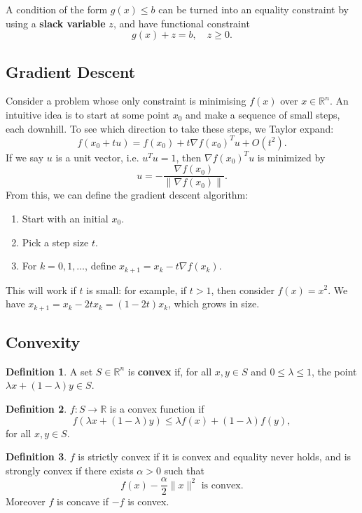 \documentclass[12pt]{article}
\theoremstyle{definition}
\newtheorem{definition}{Definition}[section]
\theoremstyle{remark}
\begin{document}
A condition of the form $g(x) \leq b$ can be turned into an equality constraint by using a \textbf{slack variable} $z$, and have functional constraint
\[
	g(x) + z = b, \quad z \geq 0
.\]

\subsection{Gradient Descent}%
\label{sub:gradient_descent}

Consider a problem whose only constraint is minimising $f(x)$ over $x \in \mathbb{R}^{n}$. An intuitive idea is to start at some point $x_0$ and make a sequence of small steps, each downhill. To see which direction to take these steps, we Taylor expand:
\[
	f(x_0 + tu) = f(x_0) + t \nabla f(x_0)^{T} u + O(t^2)
.\]
If we say $u$ is a unit vector, i.e. $u^{T}u = 1$, then $\nabla f(x_0)^{T}u$ is minimized by
\[
	u = - \frac{\nabla f(x_0)}{\|\nabla f(x_0)\|}
.\]
From this, we can define the gradient descent algorithm:
\begin{enumerate}[1)]
	\item Start with an initial $x_0$.
	\item Pick a step size $t$.
	\item For $k = 0, 1, \ldots$, define $x_{k+1} = x_k - t \nabla f(x_k)$.
\end{enumerate}
This will work if $t$ is small: for example, if $t > 1$, then consider $f(x) = x^2$. We have $x_{k+1} = x_k - 2tx_k = (1 - 2t)x_k$, which grows in size.

\subsection{Convexity}%
\label{sub:convexity}

\begin{definition}
	A set $S \in \mathbb{R}^{n}$ is \textbf{convex} if, for all $x, y \in S$ and $0 \leq \lambda \leq 1$, the point $\lambda x + (1 - \lambda)y \in S$.
\end{definition}

\begin{definition}
	$f : S \to \mathbb{R}$ is a convex function if
	\[
		f(\lambda x + (1 - \lambda)y) \leq \lambda f(x) + (1 - \lambda) f(y)
	,\]
	for all $x, y \in S$.
\end{definition}

\begin{definition}
	$f$ is strictly convex if it is convex and equality never holds, and is strongly convex if there exists $\alpha > 0$ such that
	\[
		f(x) - \frac{\alpha}{2} \| x \|^2 \text{ is convex}
	.\]
	Moreover $f$ is concave if $-f$ is convex.
\end{definition}
\end{document}
